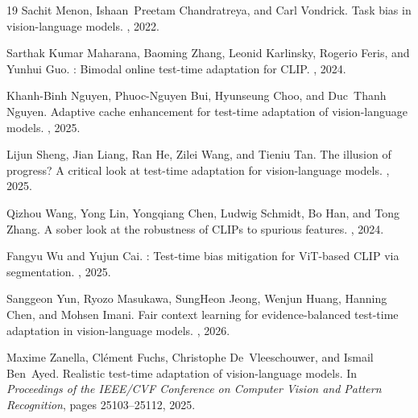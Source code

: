 \documentclass{article}
\begin{document}
\begin{thebibliography}{19}
Sachit Menon, Ishaan~Preetam Chandratreya, and Carl Vondrick.
\newblock Task bias in vision-language models.
, 2022.

Sarthak Kumar Maharana, Baoming Zhang, Leonid Karlinsky, Rogerio Feris, and Yunhui Guo.
: Bimodal online test-time adaptation for {CLIP}.
, 2024.

Khanh-Binh Nguyen, Phuoc-Nguyen Bui, Hyunseung Choo, and Duc~Thanh Nguyen.
\newblock Adaptive cache enhancement for test-time adaptation of vision-language models.
, 2025.

Lijun Sheng, Jian Liang, Ran He, Zilei Wang, and Tieniu Tan.
\newblock The illusion of progress? A critical look at test-time adaptation for vision-language models.
, 2025.

Qizhou Wang, Yong Lin, Yongqiang Chen, Ludwig Schmidt, Bo Han, and Tong Zhang.
\newblock A sober look at the robustness of {CLIP}s to spurious features.
, 2024.

Fangyu Wu and Yujun Cai.
: Test-time bias mitigation for {ViT}-based {CLIP} via segmentation.
, 2025.

Sanggeon Yun, Ryozo Masukawa, SungHeon Jeong, Wenjun Huang, Hanning Chen, and Mohsen Imani.
\newblock Fair context learning for evidence-balanced test-time adaptation in vision-language models.
, 2026.

Maxime Zanella, Cl{\'e}ment Fuchs, Christophe De~Vleeschouwer, and Ismail Ben~Ayed.
\newblock Realistic test-time adaptation of vision-language models.
\newblock In {\em Proceedings of the IEEE/CVF Conference on Computer Vision and Pattern Recognition}, pages 25103--25112, 2025.


\end{thebibliography}
\end{document}
